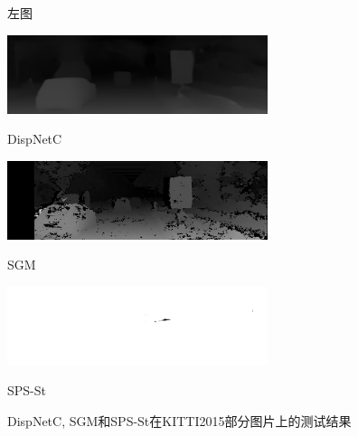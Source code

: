 \begin{figure}[!htb]
\begin{minipage}{0.48\linewidth}
	\vspace{-10pt}
	\centerline{左图}
\end{minipage}
\hfill
\begin{minipage}{0.48\linewidth}
	\centerline{\includegraphics[width=3in]{figures/cmp_kitti/pred_097}}
	\vspace{-10pt}
	\centerline{DispNetC}
\end{minipage}
\vfill
\begin{minipage}{0.48\linewidth}
	\centerline{\includegraphics[width=3in]{figures/cmp_kitti/sgm_097}}
	\vspace{-10pt}
	\centerline{SGM}
\end{minipage}
\hfill
\begin{minipage}{0.48\linewidth}
	\centerline{\includegraphics[width=3in]{figures/cmp_kitti/sps_097}}
	\vspace{-10pt}
	\centerline{SPS-St}
\end{minipage}
	\caption{DispNetC, SGM和SPS-St在KITTI2015部分图片上的测试结果}
\label{fig:4_3_kitti_cmp_result}
\end{figure}

